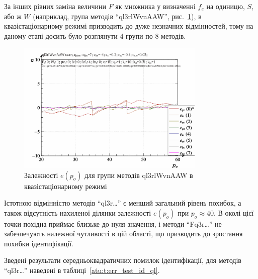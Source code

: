 За інших рівних заміна величини
$ F $ як множника у визначенні
$ f_e $ на одиницю,
$ S $, або ж
$ W $ (наприклад, група методів ``ql3rlWvnAAW'', рис.~\ref{atu:f:ql3rlWvnAAW_scan}),
в квазістаціонарному режимі призводить до дуже незначних
відмінностей, тому на даному етапі досить було розглянути 4
групи по 8 методів.

\begin{figure}[htb!]
  \begin{center}
    \includegraphics[width=0.8\textwidth]{p/scan/qls-p_p_e_ql3rlWvnAAW_scan.png}
  \end{center}
  \caption{Залежності $e(p_o)$ для групи методів ql3rlWvnAAW в квазістаціонарному режимі}
  \label{atu:f:ql3rlWvnAAW_scan}
\end{figure}

Істотною відмінністю методів ``ql3r\ldots'' є менший загальний рівень
похибок, а також відсутність нахиленої ділянки залежності $e (p_o)$ при
$p_o \approx 40$. В околі цієї точки похідна приймає близьке до нуля значення, і
методи ``Fq3r\ldots'' не забезпечують належної чутливості в цій області, що
призводить до зростання похибки ідентифікації.


Зведені результати середньоквадратичних помилок ідентифікації,
для методів ``ql3r\ldots'' наведені в таблиці~\ref{atu:t:err_test_id_ql}.

